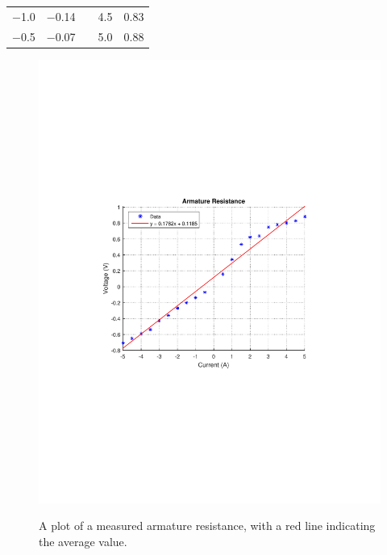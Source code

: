 \begin{table}[H]
\begin{tabular}{|l|l|l| l|l|}
\cline{1-2}\cline{4-5}%
  \SI{-1,0}{}               &            \SI{-0,14}{}  &             & \SI{4,5}{} & \SI{0,83}{}             \\
\cline{1-2}\cline{4-5}%
  \SI{-0,5}{}               &            \SI{-0,07}{}  &             & \SI{5,0}{}                & \SI{0,88}{}             \\
\cline{1-2}\cline{4-5}%
\end{tabular}
\end{table}

\begin{figure}[H]
  \centering
  {
    \includegraphics[width=\textwidth]{figures/armatureResistance.pdf}
  }
  \caption{A plot of a measured armature resistance, with a red line indicating the average value.}
  \label{armatureResistance}
\end{figure}


